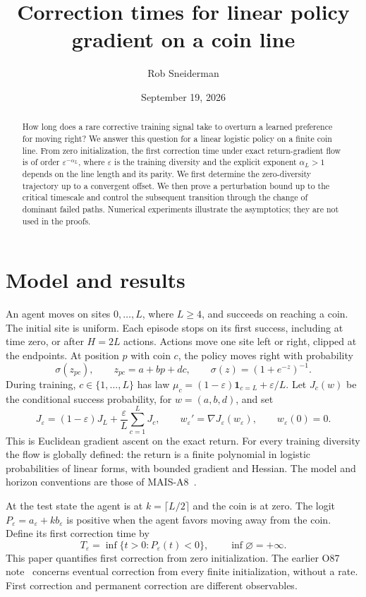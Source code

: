 \documentclass[11pt]{article}
\title{Correction times for linear policy gradient on a coin line}
\author{Rob Sneiderman}\date{September 19, 2026}
\newcommand{\eps}{\varepsilon}\newcommand{\R}{\mathbb R}
\begin{document}
\maketitle
\begin{abstract}
How long does a rare corrective training signal take to overturn a learned
preference for moving right? We answer this question for a linear logistic
policy on a finite coin line. From zero initialization, the first correction
time under exact return-gradient flow is of order $\varepsilon^{-\alpha_L}$,
where $\varepsilon$ is the training diversity and the explicit exponent
$\alpha_L>1$ depends on the line length and its parity. We first determine
the zero-diversity trajectory up to a convergent offset. We then prove a
perturbation bound up to the critical timescale and control the subsequent
transition through the change of dominant failed paths. Numerical experiments
illustrate the asymptotics; they are not used in the proofs.
\end{abstract}

\section{Model and results}
An agent moves on sites $0,\ldots,L$, where $L\ge4$, and succeeds on reaching
a coin. The initial site is uniform. Each episode stops on its first success,
including at time zero, or after $H=2L$ actions. Actions move one site left or
right, clipped at the endpoints. At position $p$ with coin $c$, the policy
moves right with probability
\[
 \sigma(z_{pc}),\qquad z_{pc}=a+bp+dc,\qquad \sigma(z)=(1+e^{-z})^{-1}.
\]
During training, $c\in\{1,\ldots,L\}$ has law
$\mu_c=(1-\eps)\mathbf1_{c=L}+\eps/L$. Let $J_c(w)$ be the conditional
success probability, for $w=(a,b,d)$, and set
\[
 J_\eps=(1-\eps)J_L+\frac\eps L\sum_{c=1}^LJ_c,\qquad
 w_\eps'=\nabla J_\eps(w_\eps),\qquad w_\eps(0)=0.
\]
This is Euclidean gradient ascent on the exact return. For every training
diversity the flow is globally defined: the return is a finite polynomial
in logistic probabilities of linear forms, with bounded gradient and Hessian.
The model and horizon
conventions are those of MAIS-A8~\cite{a8}.

At the test state the agent is at $k=\lceil L/2\rceil$ and the coin is at
zero. The logit $P_\eps=a_\eps+kb_\eps$ is positive when the agent favors
moving away from the coin. Define its first correction time by
\[
 T_\eps=\inf\{t>0:P_\eps(t)<0\},\qquad \inf\varnothing=+\infty.
\]
This paper quantifies first correction from zero initialization. The earlier
O87 note~\cite{o87} concerns eventual correction from every finite
initialization, without a rate. First correction and permanent correction
are different observables.
\end{document}
